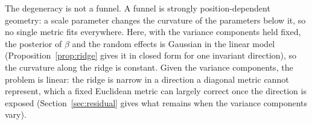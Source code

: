The degeneracy is not a funnel. A funnel is strongly position-dependent
geometry: a scale parameter changes the curvature of the parameters below
it, so no single metric fits everywhere. Here, with the variance
components held fixed, the posterior of $\beta$ and the random effects is
Gaussian in the linear model (Proposition~\ref{prop:ridge} gives it in closed form for one invariant direction), so the curvature along the ridge is constant. Given the variance components, the problem is linear: the ridge is narrow in a direction a diagonal metric cannot represent, which a fixed Euclidean metric can largely correct once the direction is exposed (Section~\ref{sec:residual} gives what remains when the variance components vary).
